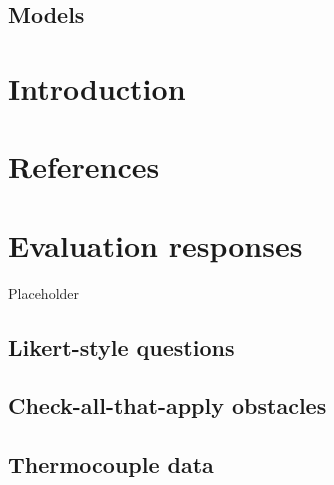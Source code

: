 \documentclass[atmosphere,article,submit,moreauthors,pdftex,10pt,a4paper]{style/mdpi}
\begin{document}
\hypertarget{models}{%
\subsection{Models}\label{models}}

\hypertarget{introduction-1}{%
\section{Introduction}\label{introduction-1}}

\hypertarget{references}{%
\section*{References}\label{references}}


\hypertarget{evaluation-responses}{%
\section{Evaluation responses}\label{evaluation-responses}}

Placeholder

\hypertarget{likert-style-questions}{%
\subsection{Likert-style questions}\label{likert-style-questions}}

\hypertarget{check-all-that-apply-obstacles}{%
\subsection{Check-all-that-apply obstacles}\label{check-all-that-apply-obstacles}}

\hypertarget{thermocouple-data}{%
\subsection{Thermocouple data}\label{thermocouple-data}}

\vspace{6pt}


\end{document}
